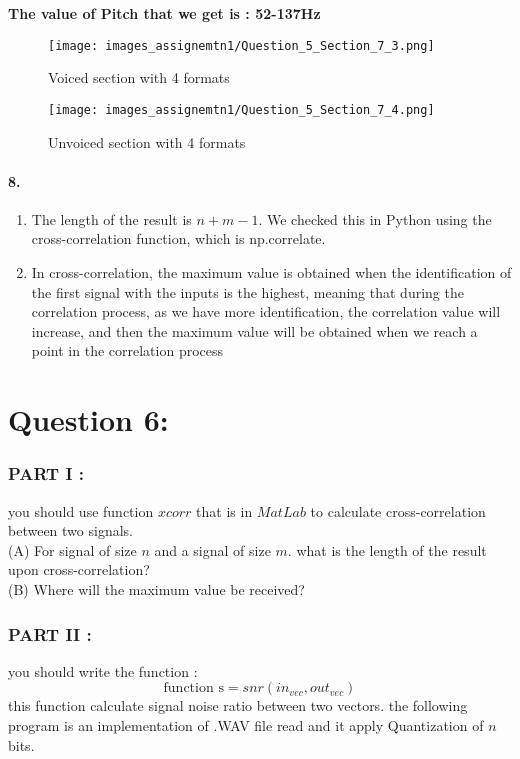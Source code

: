 \documentclass[letterpaper, 12pt]{article}
\begin{document}
\textbf{The value of Pitch that we get is : 52-137Hz }

\begin{figure}[htbp]
    \centering
    \texttt{[image: images\_assignemtn1/Question\_5\_Section\_7\_3.png]}
    \caption{Voiced section with 4 formats }
    \label{fig:sec_7_3}
\end{figure}

\begin{figure}[htbp]
    \centering
    \texttt{[image: images\_assignemtn1/Question\_5\_Section\_7\_4.png]}
    \caption{Unvoiced section with 4 formats}
    \label{fig:sec_7_4}
\end{figure}

\newpage 

\paragraph{8.}
   \begin{enumerate}
       \item The length of the result is \(n+m-1\). We checked this in Python using the cross-correlation function, which is np.correlate.
       \item In cross-correlation, the maximum value is obtained when the identification of the first signal with the inputs is the highest, meaning that during the correlation process, as we have more identification, the correlation value will increase, and then the maximum value will be obtained when we reach a point in the correlation process
    \end{enumerate}
\newpage

\section*{Question 6:}
\subsubsection*{PART I :}
you should use function $xcorr$ that is in $MatLab$ to calculate cross-correlation between two signals. \\
(A) For signal of size $n$ and a signal of size $m$. what is the length of the result upon cross-correlation? \\
(B) Where will the maximum value be received? \\
\subsubsection*{PART II :}
you should write the function :
\[\text{function s} = snr(in_{vec},out_{vec})\]
this function calculate signal noise ratio between two vectors. the following program is an implementation of .WAV file read and it apply Quantization of $n$ bits.
\end{document}
